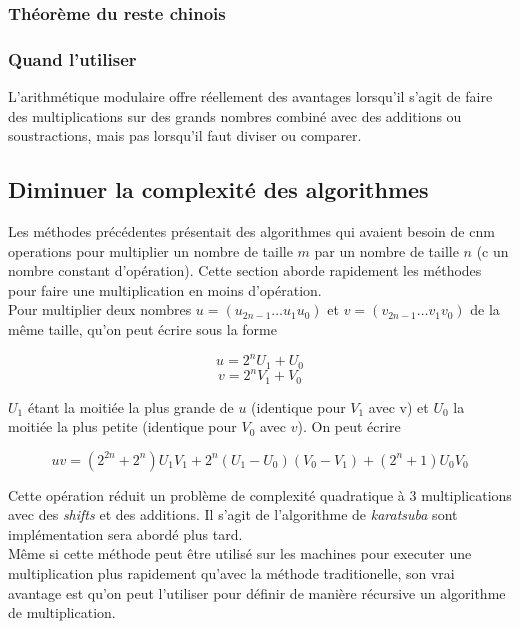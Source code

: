 \documentclass[letterpaper]{article}
\begin{document}
\subsubsection{Théorème du reste chinois}

\subsubsection{Quand l'utiliser}

L'arithmétique modulaire offre réellement des avantages lorsqu'il s'agit de faire
des multiplications sur des grands nombres combiné avec des additions ou
soustractions, mais pas lorsqu'il faut diviser ou comparer.

\subsection{Diminuer la complexité des algorithmes}

Les méthodes précédentes présentait des algorithmes qui avaient besoin de cnm operations pour multiplier un nombre de taille
$m$ par un nombre de taille $n$ (c un nombre constant d'opération). Cette section aborde rapidement les méthodes pour faire
une multiplication en moins d'opération. \\

Pour multiplier deux nombres $u = (u_{2n-1} \dots u_1 u_0)$ et $v = (v_{2n-1} \dots v_1 v_0)$ de la même taille, qu'on peut
écrire sous la forme

  $$u = 2^{n} U_1 + U_0$$
  $$v = 2^{n} V_1 + V_0$$

$U_1$ étant la moitiée la plus grande de $u$ (identique pour $V_1$ avec v) et $U_0$ la moitiée la plus petite (identique pour
$V_0$ avec $v$). On peut écrire

  $$uv = (2^{2n} + 2^n) U_1 V_1 + 2^n (U_1 - U_0) (V_0 - V_1) + (2^n + 1) U_0 V_0$$

Cette opération réduit un problème de complexité quadratique à 3 multiplications avec des \emph{shifts} et des additions. Il
s'agit de l'algorithme de \emph{karatsuba} sont implémentation sera abordé plus tard.\\

Même si cette méthode peut être utilisé sur les machines pour executer une
multiplication plus rapidement qu'avec la méthode traditionelle, son vrai
avantage est qu'on peut l'utiliser pour définir de manière récursive un
algorithme de multiplication.

\end{document}
